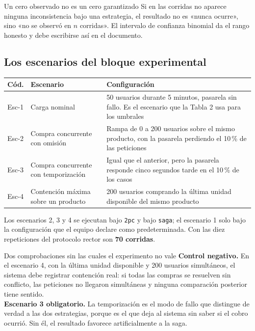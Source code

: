\documentclass[11pt,a4paper]{article}
\begin{document}
\begin{avisoBox}{Un cero observado no es un cero garantizado}
	Si en las corridas no aparece ninguna inconsistencia bajo una estrategia, el resultado no es «nunca ocurre», sino «no se observó en $n$ corridas». El intervalo de confianza binomial da el rango honesto y debe escribirse así en el documento.
\end{avisoBox}

\subsection{Los escenarios del bloque experimental}

\begin{center}
	\small
	\begin{tabular}{@{}p{1.3cm}p{5.4cm}p{8.3cm}@{}}
		\toprule
		\textbf{Cód.} & \textbf{Escenario} & \textbf{Configuración} \\
		\midrule
		Esc-1 & Carga nominal & 50 usuarios durante 5 minutos, pasarela sin fallo. Es el escenario que la Tabla 2 usa para los umbrales \\
		\addlinespace
		Esc-2 & Compra concurrente con omisión & Rampa de 0 a 200 usuarios sobre el mismo producto, con la pasarela perdiendo el 10\,\% de las peticiones \\
		\addlinespace
		Esc-3 & Compra concurrente con temporización & Igual que el anterior, pero la pasarela responde cinco segundos tarde en el 10\,\% de los casos \\
		\addlinespace
		Esc-4 & Contención máxima sobre un producto & 200 usuarios comprando la última unidad disponible del mismo producto \\
		\bottomrule
	\end{tabular}
\end{center}

Los escenarios 2, 3 y 4 se ejecutan bajo \texttt{2pc} y bajo \texttt{saga}; el escenario 1 solo bajo la configuración que el equipo declare como predeterminada. Con las diez repeticiones del protocolo rector son \textbf{70 corridas}.

\begin{pisoBox}{Dos comprobaciones sin las cuales el experimento no vale}
	\textbf{Control negativo.} En el escenario 4, con la última unidad disponible y 200 usuarios simultáneos, el sistema debe registrar contención real: si todas las compras se resuelven sin conflicto, las peticiones no llegaron simultáneas y ninguna comparación posterior tiene sentido.\\[5pt]
	\textbf{Escenario 3 obligatorio.} La temporización es el modo de fallo que distingue de verdad a las dos estrategias, porque es el que deja al sistema sin saber si el cobro ocurrió. Sin él, el resultado favorece artificialmente a la saga.
\end{pisoBox}
\end{document}
